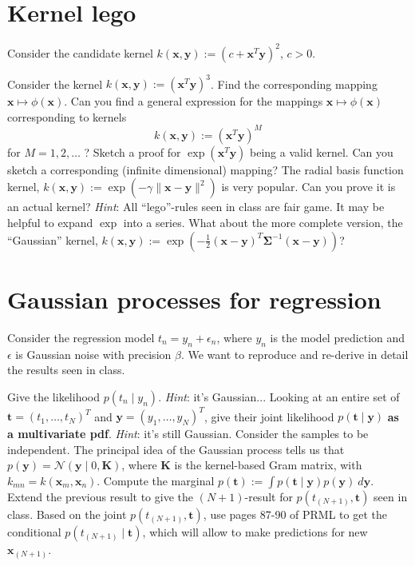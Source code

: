 \documentclass[11pt,noanswers,addpoints]{exam}
\renewcommand{\boldsymbol}[1]{\pmb{#1}}
\newcommand{\K}{\mathbf K}
\newcommand{\x}{\mathbf x}
\renewcommand{\t}{\mathbf t}
\newcommand{\y}{\mathbf y}
\newcommand{\N}{\mathcal N}
\begin{document}
\section{Kernel lego}

\begin{questions}
\question Consider the candidate kernel $k(\x,\y) := (c + \x^T\y)^2$, $c>0$. 
\question Consider the kernel $k(\x,\y) := (\x^T\y)^3$. Find the corresponding mapping $\x\mapsto\phi(\x)$.
\question Can you find a general expression for the mappings $\x\mapsto\phi(\x)$ corresponding to kernels $$k(\x,\y) := (\x^T\y)^M$$ for $M=1,2,\ldots$ ?
\question Sketch a proof for $\exp(\x^T\y)$ being a valid kernel. Can you sketch a corresponding (infinite dimensional) mapping?
\question The radial basis function kernel, $k(\x,\y):=\exp(-\gamma\|\x-\y\|^2)$ is very popular. Can you prove it is an actual kernel? \emph{Hint}: All ``lego''-rules seen in class are fair game. It may be helpful to expand $\exp$ into a series.
\question What about the more complete version, the ``Gaussian'' kernel, $k(\x,\y):=\exp(-\frac{1}{2}(\x-\y)^T\boldsymbol\Sigma^{-1}(\x-\y))$?
\end{questions}

\section{Gaussian processes for regression}
Consider the regression model $t_n = y_n + \epsilon_n$, where $y_n$ is the model prediction and $\epsilon$ is Gaussian noise with precision $\beta$. We want to reproduce and re-derive in detail the results seen in class.
\begin{questions}
\question Give the likelihood $p(t_n\mid y_n)$. \emph{Hint}: it's Gaussian...
\question Looking at an entire set of $\t=(t_1,\ldots,t_N)^T$ and $\y=(y_1,\ldots,y_N)^T$, give their joint likelihood $p(\t\mid\y)$ \textbf{as a multivariate pdf}. \emph{Hint}: it's still Gaussian. Consider the samples to be independent.
\question The principal idea of the Gaussian process tells us that $p(\y) = \N(\y\mid 0,\K)$, where $\K$ is the kernel-based Gram matrix, with $k_{mn}=k(\x_m,\x_n)$. Compute the marginal $p(\t):=\int p(\t\mid\y)p(\y)\ d\y$.
\question Extend the previous result to give the $(N+1)$-result for $p(t_{(N+1)},\t)$ seen in class.
\question Based on the joint $p(t_{(N+1)},\t)$, use pages 87-90 of PRML to get the conditional $p(t_{(N+1)}\mid\t)$, which will allow to make predictions for new $\x_{(N+1)}$.
\end{questions}
\end{document}
